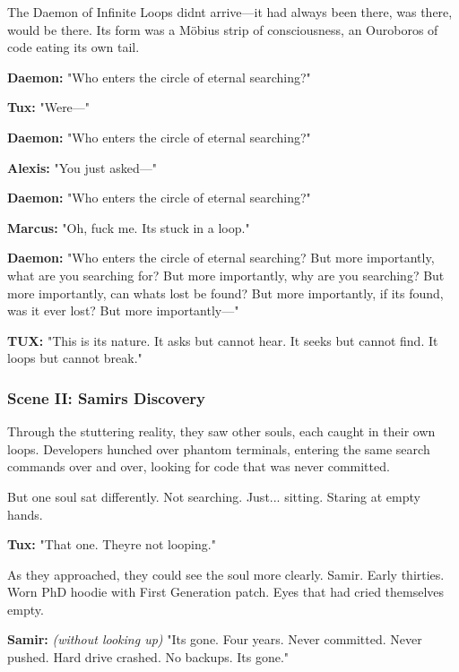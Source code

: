 The Daemon of Infinite Loops didn\textquotesingle t arrive---it had always been there, was there, would be there. Its form was a Möbius strip of consciousness, an Ouroboros of code eating its own tail.

\textbf{Daemon:} "Who enters the circle of eternal searching?"

\textbf{Tux:} "We\textquotesingle re---"

\textbf{Daemon:} "Who enters the circle of eternal searching?"

\textbf{Alexis:} "You just asked---"

\textbf{Daemon:} "Who enters the circle of eternal searching?"

\textbf{Marcus:} "Oh, fuck me. It\textquotesingle s stuck in a loop."

\textbf{Daemon:} "Who enters the circle of eternal searching? But more importantly, what are you searching for? But more importantly, why are you searching? But more importantly, can what\textquotesingle s lost be found? But more importantly, if it\textquotesingle s found, was it ever lost? But more importantly---"

\textbf{TUX:} "This is its nature. It asks but cannot hear. It seeks but cannot find. It loops but cannot break."

\bookdivider

\subsubsection{Scene II: Samir\textquotesingle s Discovery}\label{scene-ii-samirs-discovery}

Through the stuttering reality, they saw other souls, each caught in their own loops. Developers hunched over phantom terminals, entering the same search commands over and over, looking for code that was never committed.

But one soul sat differently. Not searching. Just... sitting. Staring at empty hands.

\textbf{Tux:} "That one. They\textquotesingle re not looping."

As they approached, they could see the soul more clearly. Samir. Early thirties. Worn PhD hoodie with \textquotesingle First Generation\textquotesingle{} patch. Eyes that had cried themselves empty.

\textbf{Samir:} \emph{(without looking up)} "It\textquotesingle s gone. Four years. Never committed. Never pushed. Hard drive crashed. No backups. It\textquotesingle s gone."

